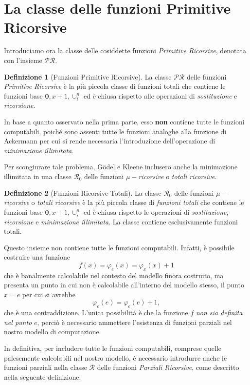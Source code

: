 \documentclass[10pt]{\classname}
\theoremstyle{definition}
\newtheorem{definizione}{Definizione}[section]
\theoremstyle{definition}
\theoremstyle{definition}
\theoremstyle{definition}
\begin{document}
\section{La classe delle funzioni Primitive Ricorsive}

Introduciamo ora la classe delle cosiddette funzioni \emph{Primitive Ricorsive}, denotata con l'insieme $\mathcal {PR}.$

\begin{definizione}[Funzioni Primitive Ricorsive]
    La classe $\mathcal {PR}$ delle funzioni \emph{Primitive Ricorsive} è la più piccola classe di funzioni totali che contiene le funzioni base $\bm{0}, x+1, \cup_i^n$ ed è chiusa rispetto alle operazioni di \emph{sostituzione} e \emph{ricorsione}.
\end{definizione}

In base a quanto osservato nella prima parte, esso \textbf{non} contiene tutte le funzioni computabili, poiché sono assenti tutte le funzioni analoghe alla funzione di Ackermann per cui si rende necessaria l'introduzione dell'operazione di \emph{minimazione illimitata}.

Per scongiurare tale problema, Gödel e Kleene inclusero anche la minimazione illimitata in una classe $\mathcal R_0$ delle funzioni $\mu-$\emph{ricorsive} o \emph{totali ricorsive}.

\begin{definizione}[Funzioni Ricorsive Totali]
    La classe $\mathcal R_0$ delle funzioni $\mu-$\emph{ricorsive} o \emph{totali ricorsive} è la più piccola classe di \emph{funzioni totali} che contiene le funzioni base $\bm{0}, x+1, \cup_i^n$ ed è chiusa rispetto le operazioni di \emph{sostituzione}, \emph{ricorsione} e \emph{minimazione illimitata}. La classe contiene esclusivamente funzioni totali.
\end{definizione}

Questo insieme non contiene tutte le funzioni computabili. Infatti, è possibile costruire una funzione \[f(x) = \varphi_e(x) = \varphi_x(x) + 1\] che è banalmente calcolabile nel contesto del modello finora costruito, ma presenta un punto in cui non è calcolabile all'interno del modello stesso, il punto $x=e$ per cui si avrebbe
\[\varphi_e(e) = \varphi_e(e) + 1,\] che è una contraddizione. L'unica possibilità è che la funzione $f$ \emph{non sia definita nel punto} $e$, perciò è necessario ammettere l'esistenza di funzioni parziali nel nostro modello di computazione.

In definitiva, per includere tutte le funzioni computabili, comprese quelle palesemente calcolabili nel nostro modello, è necessario introdurre anche le funzioni parziali nella classe $\mathcal {R}$ delle funzioni \emph{Parziali Ricorsive}, come descritto nella seguente definizione.
\end{document}
